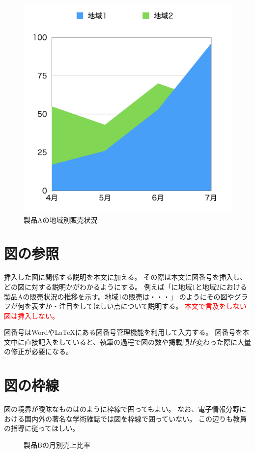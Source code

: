 \begin{figure}[htbp]
  \centering
  \includegraphics[width=0.5\linewidth]{fig/chart1.png}
  \caption{製品Aの地域別販売状況}
  \label{fig:chart1}
\end{figure}

\section{図の参照}

挿入した図に関係する説明を本文に加える。
その際は本文に図番号を挿入し、どの図に対する説明かがわかるようにする。
例えば「に地域1と地域2における製品Aの販売状況の推移を示す。地域1の販売は・・・」
のようにその図やグラフが何を表すか・注目をしてほしい点について説明する。
\textcolor{red}{本文で言及をしない図は挿入しない。}

図番号はWordや\LaTeX にある図番号管理機能を利用して入力する。
図番号を本文中に直接記入をしていると、執筆の過程で図の数や掲載順が変わった際に大量の修正が必要になる。


\section{図の枠線}

図の境界が曖昧なものはのように枠線で囲ってもよい。
なお、電子情報分野における国内外の著名な学術雑誌では図を枠線で囲っていない。
この辺りも教員の指導に従ってほしい。

\begin{figure}[H]
  \centering
  \caption{製品Bの月別売上比率}
  \label{fig:chart2}
\end{figure}

